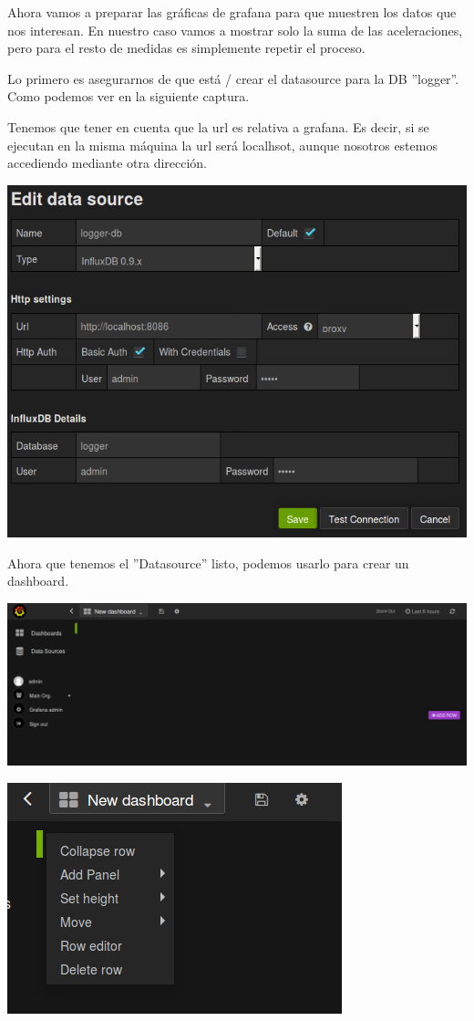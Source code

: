 \documentclass[12pt, a4paper, oneside, titlepage]{article}
\begin{document}
Ahora vamos a preparar las gráficas de grafana para que muestren los datos que nos interesan. En nuestro caso vamos a mostrar solo la suma de las aceleraciones, pero para el resto de medidas es simplemente repetir el proceso.

Lo primero es asegurarnos de que está / crear el datasource para la DB ''logger''. Como podemos ver en la siguiente captura.

Tenemos que tener en cuenta que la url es relativa a grafana. Es decir, si se ejecutan en la misma máquina la url será localhsot, aunque nosotros estemos accediendo mediante otra dirección.

\includegraphics[width=0.9\linewidth,keepaspectratio]{img/grafana-1.png}

Ahora que tenemos el ''Datasource'' listo, podemos usarlo para crear un dashboard.

\includegraphics[width=0.9\linewidth,keepaspectratio]{img/grafana-2.png}

\includegraphics[width=0.9\linewidth,keepaspectratio]{img/grafana-3.png}
\end{document}
